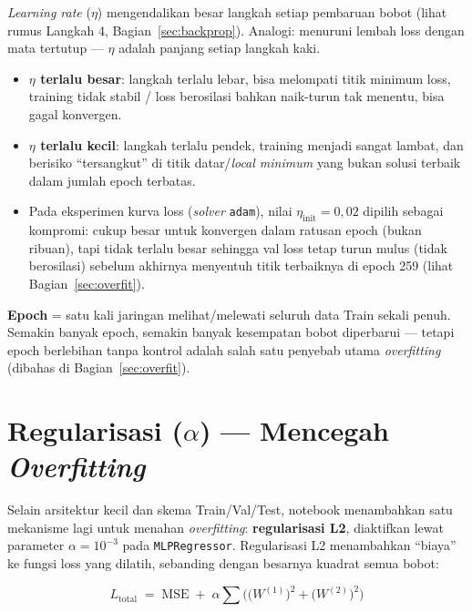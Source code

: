 \documentclass[11pt,a4paper]{article}
\begin{document}
\emph{Learning rate} ($\eta$) mengendalikan besar langkah setiap pembaruan bobot (lihat
rumus Langkah 4, Bagian~\ref{sec:backprop}). Analogi: menuruni lembah loss dengan mata
tertutup --- $\eta$ adalah panjang setiap langkah kaki.

\begin{itemize}[nosep]
  \item \textbf{$\eta$ terlalu besar}: langkah terlalu lebar, bisa melompati titik
  minimum loss, training tidak stabil / loss berosilasi bahkan naik-turun tak menentu,
  bisa gagal konvergen.
  \item \textbf{$\eta$ terlalu kecil}: langkah terlalu pendek, training menjadi sangat
  lambat, dan berisiko ``tersangkut'' di titik datar/\emph{local minimum} yang bukan
  solusi terbaik dalam jumlah epoch terbatas.
  \item Pada eksperimen kurva loss (\emph{solver} \texttt{adam}), nilai
  $\eta_{\text{init}} = 0{,}02$ dipilih sebagai kompromi: cukup besar untuk konvergen
  dalam ratusan epoch (bukan ribuan), tapi tidak terlalu besar sehingga val loss tetap
  turun mulus (tidak berosilasi) sebelum akhirnya menyentuh titik terbaiknya di epoch 259
  (lihat Bagian~\ref{sec:overfit}).
\end{itemize}

\textbf{Epoch} = satu kali jaringan melihat/melewati seluruh data Train sekali penuh.
Semakin banyak epoch, semakin banyak kesempatan bobot diperbarui --- tetapi epoch
berlebihan tanpa kontrol adalah salah satu penyebab utama \emph{overfitting} (dibahas di
Bagian~\ref{sec:overfit}).

\section{Regularisasi ($\alpha$) --- Mencegah \emph{Overfitting}}
\label{sec:reg}

Selain arsitektur kecil dan skema Train/Val/Test, notebook menambahkan satu mekanisme
lagi untuk menahan \emph{overfitting}: \textbf{regularisasi L2}, diaktifkan lewat
parameter $\alpha = 10^{-3}$ pada \texttt{MLPRegressor}. Regularisasi L2 menambahkan
``biaya'' ke fungsi loss yang dilatih, sebanding dengan besarnya kuadrat semua bobot:

\begin{formulabox}
\[
  L_{\text{total}} \;=\; \mathrm{MSE} \;+\; \alpha \sum \Big( \big(W^{(1)}\big)^2 + \big(W^{(2)}\big)^2 \Big)
\]
\end{formulabox}
\end{document}
